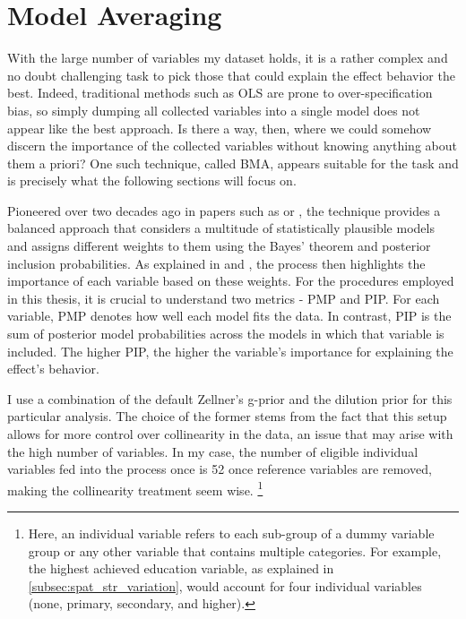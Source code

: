 \section{Model Averaging}
\label{sec:bma}

With the large number of variables my dataset holds, it is a rather complex and no doubt challenging task to pick those that could explain the effect behavior the best. Indeed, traditional methods such as \ac{OLS} are prone to over-specification bias, so simply dumping all collected variables into a single model does not appear like the best approach. Is there a way, then, where we could somehow discern the importance of the collected variables without knowing anything about them a priori? One such technique, called \ac{BMA}, appears suitable for the task and is precisely what the following sections will focus on.

Pioneered over two decades ago in papers such as \cite{hoeting1999bayesian} or \cite{raftery1997bayesian}, the technique provides a balanced approach that considers a multitude of statistically plausible models and assigns different weights to them using the Bayes' theorem and posterior inclusion probabilities. As explained in \cite{hoeting1999bayesian} and \cite{amini2011bayesian}, the process then highlights the importance of each variable based on these weights. For the procedures employed in this thesis, it is crucial to understand two metrics - \ac{PMP} and \ac{PIP}. For each variable, \ac{PMP} denotes how well each model fits the data. In contrast, \ac{PIP} is the sum of posterior model probabilities across the models in which that variable is included. The higher \ac{PIP}, the higher the variable's importance for explaining the effect's behavior.

I use a combination of the default Zellner's g-prior and the dilution prior for this particular analysis. The choice of the former stems from the fact that this setup allows for more control over collinearity in the data, an issue that may arise with the high number of variables. In my case, the number of eligible individual variables fed into the process once is 52 once reference variables are removed, making the collinearity treatment seem wise. \footnote{Here, an individual variable refers to each sub-group of a dummy variable group or any other variable that contains multiple categories. For example, the highest achieved education variable, as explained in \autoref{subsec:spat_str_variation}, would account for four individual variables (none, primary, secondary, and higher).}

